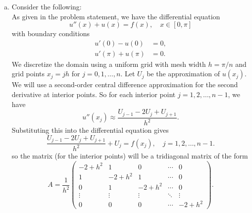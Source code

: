 \documentclass{article}
\begin{document}
\begin{enumerate}[(a)]
  \item Consider the following: \\
  As given in the problem statement, we have the differential equation
  \begin{equation*}
    u''(x) + u(x) = f(x), \quad x \in [0,\pi]
  \end{equation*}
  with boundary conditions
  \begin{align*}
    u'(0) - u(0) & = 0, \\
    u'(\pi) + u(\pi) & = 0.
  \end{align*}
  We discretize the domain using a uniform grid with mesh width $h = \pi/n$ and grid points $x_j = jh$ for $j = 0, 1, \ldots, n$. Let $U_j$ be the approximation of $u(x_j)$. We will use a second-order central difference approximation for the second derivative at interior points. So for each interior point $j = 1, 2, \ldots, n-1$, we have
  \begin{equation*}
    u''(x_j) \approx \frac{U_{j-1} - 2U_j + U_{j+1}}{h^2}.
  \end{equation*}
  Substituting this into the differential equation gives
  \begin{equation*}
    \frac{U_{j-1} - 2U_j + U_{j+1}}{h^2} + U_j = f(x_j), \quad j = 1, 2, \ldots, n-1.
  \end{equation*}
  so the matrix (for the interior points) will be a tridiagonal matrix of the form
  \begin{equation*}
    A = \frac{1}{h^2}\begin{pmatrix}
      -2 + h^2 & 1        & 0        & \cdots & 0        \\
      1        & -2 + h^2 & 1        & \cdots & 0        \\
      0        & 1        & -2 + h^2 & \cdots & 0        \\
      \vdots   & \vdots   & \vdots   & \ddots & \vdots   \\
      0        & 0        & 0        & \cdots & -2 + h^2
    \end{pmatrix}.
  \end{equation*}

\end{enumerate}
\end{document}

